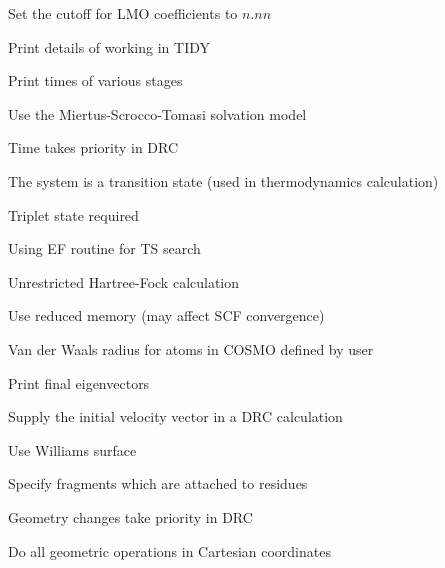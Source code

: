 \begin{description}
\item[] Set the cutoff for LMO coefficients to $n.nn$
\item[] Print details of working in TIDY
\item[] Print times of various stages
\item[] Use the Miertus-Scrocco-Tomasi solvation model
\item[] Time takes priority in DRC
\item[] The system is a transition state (used in thermodynamics calculation)
\item[] Triplet state required
\item[] Using EF routine for TS search
\item[] Unrestricted Hartree-Fock calculation
\item[] Use reduced memory (may affect SCF convergence)
\item[] Van der Waals radius for atoms in COSMO defined by user
\item[] Print final eigenvectors
\item[] Supply the initial velocity vector in a DRC calculation
\item[] Use Williams surface
\item[] Specify fragments which are attached to residues
\item[] Geometry changes take priority in DRC
\item[] Do all geometric operations in Cartesian coordinates
\end{description}
